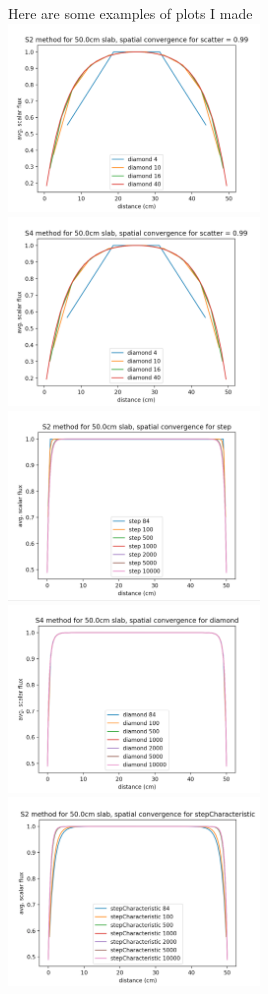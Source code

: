\documentclass[a4paper]{article}
\begin{document}
Here are some examples of plots I made\\
\includegraphics[width=0.5\textwidth]{f8}
\includegraphics[width=0.5\textwidth]{f9}\\
\includegraphics[width=0.5\textwidth]{f10}
\includegraphics[width=0.5\textwidth]{f11}\\
\includegraphics[width=0.5\textwidth]{f12}
\end{document}
